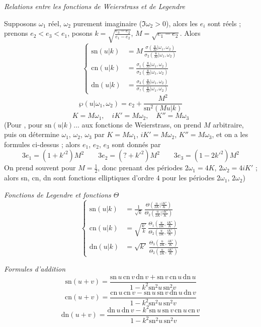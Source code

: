 \documentclass[11pt,a4paper]{article}
\begin{document}
\emph{Relations entre les fonctions de Weierstrass et de Legendre}

Supposons $\omega_1$ réel, $\omega_2$ purement imaginaire ($\Im\omega_2 > 0$),
alors les $e_i$ sont réels ; prenons $e_2 < e_3 < e_1$, posons
$k = \sqrt{\frac{e_3-e_2}{e_1-e_2}}$, $M = \sqrt{e_1-e_2}$. Alors
\[
\left\lbrace
\begin{aligned}
\mathrm{sn}(u|k) &= M\,\frac{\sigma(\frac{u}{M}|\omega_1,\omega_2)}{\sigma_2(\frac{u}{M}|\omega_1,\omega_2)}\\
\mathrm{cn}(u|k) &= \frac{\sigma_1(\frac{u}{M}|\omega_1,\omega_2)}{\sigma_2(\frac{u}{M}|\omega_1,\omega_2)}\\
\mathrm{dn}(u|k) &= \frac{\sigma_3(\frac{u}{M}|\omega_1,\omega_2)}{\sigma_?(\frac{u}{M}|\omega_1,\omega_2)}
\end{aligned}
\right.
\]
\[
\wp(u|\omega_1,\omega_2) = e_2 + \frac{M^2}{\mathrm{sn}^2(Mu|k)}
\]
\[
K = M\omega_1,\quad iK' = M\omega_2,\quad K'' = M\omega_3
\]
(Pour , pour  $\mathrm{sn}(u|k)\ldots$ aux
fonctions de Weierstrass, on prend $M$ arbitraire, puis on détermine
$\omega_1$, $\omega_2$, $\omega_3$ par $K = M\omega_1$, $iK' = M\omega_2$,
$K'' = M\omega_3$, et on a les formules ci-dessus ; \struck{\ill{}} alors
$e_1$, $e_2$, $e_3$ sont donnés par
\[
3e_1 = (1+k'^2)M^2 \qquad 3e_2 = (?+k'^2)M^2 \qquad 3e_3 = (1-2k'^2)M^2
\]
On prend souvent \add{\uncertain{\ill{}}} pour 
$M = \frac12$, donc prenant des périodes $2\omega_1 = 4K$, $2\omega_2 = 4iK'$ ;
alors sn, cn, dn sont fonctions elliptiques d'ordre $4$ pour les périodes
$2\omega_1$, $2\omega_2$)

\emph{Fonctions de Legendre et fonctions $\Theta$}
\[
\left\lbrace
\begin{aligned}
\mathrm{sn}(u|k) &= \frac{1}{\sqrt k}\,
\frac{\Theta(\frac{u}{2K}|\frac{iK'}{K})}{\Theta_2(\frac{u}{2K}|\frac{iK'}{K})}\\
\mathrm{cn}(u|k) &= \sqrt{\frac{k'}{k}}\,
\frac{\Theta_1(\frac{u}{2K},\frac{iK'}{K})}{\Theta_2(\frac{u}{2K},\frac{iK'}{K})}\\
\mathrm{dn}(u|k) &= \sqrt{k'}\,
\frac{\Theta_3(\frac{u}{2K},\frac{iK'}{K})}{\Theta_2(\frac{u}{2K},\frac{iK'}{K})}
\end{aligned}
\right.
\]

\emph{Formules d'addition}
\[
\mathrm{sn}(u+v) = \frac{\mathrm{sn}\,u\,\mathrm{cn}\,v\,\mathrm{dn}\,v
+ \mathrm{sn}\,v\,\mathrm{cn}\,u\,\mathrm{dn}\,u}{1 - k^2\mathrm{sn}^2u\,\mathrm{sn}^2v}
\]
\[
\mathrm{cn}(u+v) = \frac{\mathrm{cn}\,u\,\mathrm{cn}\,v
- \mathrm{sn}\,u\,\mathrm{sn}\,v\,\mathrm{dn}\,u\,\mathrm{dn}\,v}{1 - k^2\mathrm{sn}^2u\,\mathrm{sn}^2v}
\]
\[
\mathrm{dn}(u+v) = \frac{\mathrm{dn}\,u\,\mathrm{dn}\,v
- k^2\mathrm{sn}\,u\,\mathrm{sn}\,v\,\mathrm{cn}\,u\,\mathrm{cn}\,v}{1 - k^2\mathrm{sn}^2u\,\mathrm{sn}^2v}
\]
\end{document}
